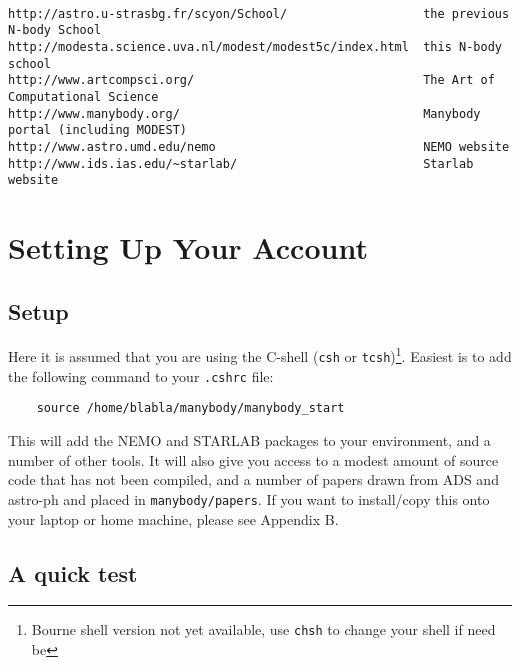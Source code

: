 \begin{verbatim}

http://astro.u-strasbg.fr/scyon/School/                   the previous N-body School
http://modesta.science.uva.nl/modest/modest5c/index.html  this N-body school
http://www.artcompsci.org/                                The Art of Computational Science
http://www.manybody.org/                                  Manybody portal (including MODEST)
http://www.astro.umd.edu/nemo                             NEMO website
http://www.ids.ias.edu/~starlab/                          Starlab website

\end{verbatim}
\appendix
\chapter                {Setting Up Your Account}

\section{Setup}

Here it is assumed that you are using 
the C-shell ({\tt csh} or {\tt tcsh})\footnote{Bourne shell version not yet available,
use {\tt chsh} to change your shell if need be}. 
Easiest is to add the following 
command to your {\tt .cshrc} file:

\begin{verbatim}
    source /home/blabla/manybody/manybody_start
\end{verbatim}

This will add the NEMO and STARLAB packages to your environment, and
a number of other tools. It will also give you access to
a modest amount of source code that has not been compiled, and a number
of papers drawn from ADS and astro-ph and placed in {\tt manybody/papers}.
If you want to install/copy this onto your laptop or home machine, please
see Appendix B.

\section{A quick test}

